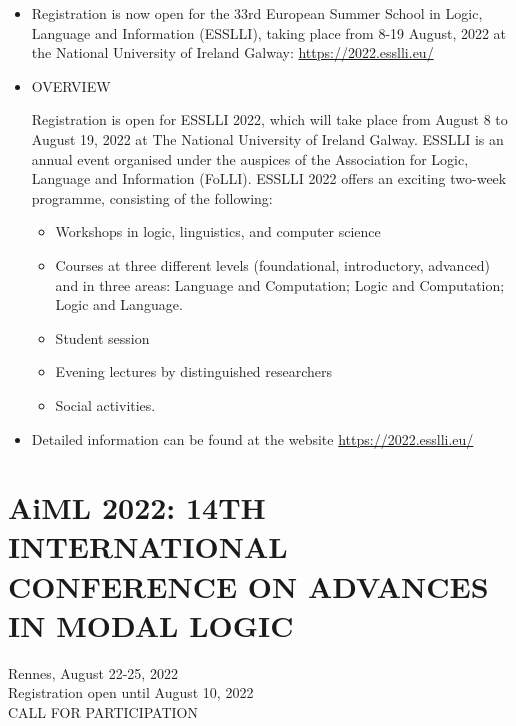 \documentclass[prodmode,acmtecs]{acmsmall} %
\begin{document}
\begin{itemize}\item   Registration is now open for the 33rd European Summer School in Logic, Language and Information (ESSLLI), taking place from 8-19 August, 2022 at the National University of Ireland Galway: \href{https://2022.esslli.eu/}{https://2022.esslli.eu/} 
 
\item  OVERVIEW 
 
  Registration is open for ESSLLI 2022, which will take place from August 8 to August 19, 2022 at The National University of Ireland Galway. ESSLLI is an annual event organised under the auspices of the Association for Logic, Language and Information (FoLLI). ESSLLI 2022 offers an exciting two-week programme, consisting of the following: 
 
\begin{itemize}\item  Workshops in logic, linguistics, and computer science
\item  Courses at three different levels (foundational, introductory, advanced) and in three areas: Language and Computation; Logic and Computation; Logic and Language.
\item  Student session
\item  Evening lectures by distinguished researchers
\item  Social activities.
\end{itemize} 
\item  Detailed information can be found at the website \href{https://2022.esslli.eu/}{https://2022.esslli.eu/} 
 
\end{itemize}\section{AiML 2022: 14TH INTERNATIONAL CONFERENCE ON ADVANCES IN MODAL LOGIC}\label{AiML2022}  Rennes, August 22-25, 2022\\ 
  Registration open until August 10, 2022\\ 
CALL FOR PARTICIPATION 
\end{document}
